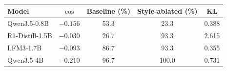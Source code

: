 \begin{tabular}{lcccc}
\toprule
Model & $\cos$ & Baseline (\%) & Style-ablated (\%) & KL \\
\midrule
Qwen3.5-0.8B & $-0.156$ & 53.3 & 23.3 & 0.388 \\
R1-Distill-1.5B & $-0.030$ & 26.7 & 93.3 & 2.615 \\
LFM3-1.7B & $-0.093$ & 86.7 & 93.3 & 0.355 \\
Qwen3.5-4B & $-0.210$ & 96.7 & 100.0 & 0.731 \\
\bottomrule
\end{tabular}